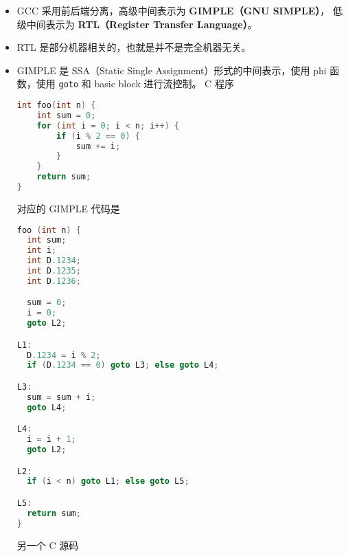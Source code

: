 
\begin{itemize}
\item GCC 采用前后端分离，高级中间表示为 \textbf{GIMPLE（GNU SIMPLE）}， 低级中间表示为 \textbf{RTL（Register Transfer Language）}。
\item RTL 是部分机器相关的，也就是并不是完全机器无关。
\item GIMPLE 是 SSA（Static Single Assignment）形式的中间表示，使用 phi 函数，使用 \verb`goto` 和 basic block 进行流控制。 C 程序
\begin{lstlisting}[language=cpp]
int foo(int n) {
    int sum = 0;
    for (int i = 0; i < n; i++) {
        if (i % 2 == 0) {
            sum += i;
        }
    }
    return sum;
}
\end{lstlisting}
对应的 GIMPLE 代码是
\begin{lstlisting}[language=cpp]
foo (int n) {
  int sum;
  int i;
  int D.1234;
  int D.1235;
  int D.1236;

  sum = 0;
  i = 0;
  goto L2;

L1:
  D.1234 = i % 2;
  if (D.1234 == 0) goto L3; else goto L4;

L3:
  sum = sum + i;
  goto L4;

L4:
  i = i + 1;
  goto L2;

L2:
  if (i < n) goto L1; else goto L5;

L5:
  return sum;
}
\end{lstlisting}
另一个 C 源码
\begin{lstlisting}[language=cpp]

\end{lstlisting}
\end{itemize}
